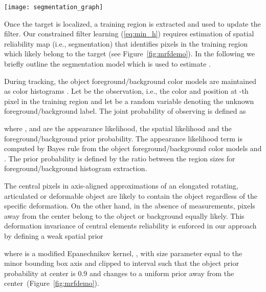 \documentclass[twocolumn]{article}
\begin{document}
\begin{figure*}[!ht]
\centering
\texttt{[image: segmentation\_graph]}
\caption{Spatial reliability map construction from the training region. From left to right: a training region with the target bounding box, t the foreground-background color models, the posterior object probability after Markov random field regularization, and the training region masked with the final binary reliability map. The probabilities are color-coded in  a blue (0.0) -- green (0.5) -- yellow (1.0) colormap.}
\label{fig:mrfdemo}
\end{figure*}

Once the target is localized, a training region is extracted and used  to update the filter. Our constrained filter learning (\ref{eq:min_h}) requires estimation of spatial reliability map  (i.e., segmentation) that identifies pixels in the training region which likely belong to the target (see Figure~\ref{fig:mrfdemo}). In the following we briefly outline the segmentation model which is used to estimate .

During tracking, the object foreground/background color models are maintained as color histograms . Let  be the observation, i.e., the color  and position  at -th pixel in the training region and let  be a random variable denoting the unknown foreground/background label. The joint probability of observing  is defined as 

where ,  and  are the appearance likelihood, the spatial likelihood and the foreground/background prior probability. The appearance likelihood term  is computed by Bayes rule from the object foreground/background color models  and . The prior probability  is defined by the ratio between the region sizes for foreground/background histogram extraction.

The central pixels in axis-aligned approximations of an elongated rotating, articulated or deformable object are likely to contain the object regardless of the specific deformation. On the other hand, in the absence of measurements, pixels away from the center belong to the object or background equally likely. This deformation invariance of central elements reliability is enforced in our approach by defining a weak spatial prior 

where  is a modified Epanechnikov kernel, , with size parameter  equal to the minor bounding box axis and clipped to interval  such that the object prior probability at center is 0.9 and changes to a uniform prior away from the center~(Figure~\ref{fig:mrfdemo}).
\end{document}

